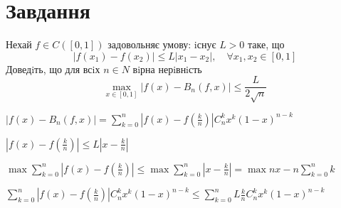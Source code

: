 

\chapter{Завдання \theHchapter}

\begin{tcolorbox}[title=Завдання]
    Нехай $f \in C([0, 1])$ задовольняє умову: iснує $L > 0$ таке, що
    $$ |f(x_1) - f(x_2)| \le L|x_1 - x_2|, 
    \quad \forall x_1,x_2 \in [0, 1] $$
    Доведiть, що для всiх $n \in N$ вiрна нерiвнiсть
    $$ \max\limits_{x\in [0, 1]} |f(x) - B_n(f, x)| 
    \le \frac{L}{2\sqrt{n}} $$
\end{tcolorbox}



$|f(x) - B_n(f,x)|=
\sum\limits_{k=0}^{n}|f(x) - f(\frac{k}{n})|C_n^kx^k(1-x)^{n-k}$


$|f(x) - f(\frac{k}{n})| \le L |x - \frac{k}{n}|$


$ \max \sum\limits_{k=0}^{n}|f(x) - f(\frac{k}{n})| \le
\max \sum\limits_{k=0}^{n}|x - \frac{k}{n}| = 
\max nx - n\sum\limits_{k=0}^{n}k$


$\sum\limits_{k=0}^{n}|f(x) - f(\frac{k}{n})|C_n^kx^k(1-x)^{n-k} \le 
\sum\limits_{k=0}^{n}L\frac{k}{n}C_n^kx^k(1-x)^{n-k}$

